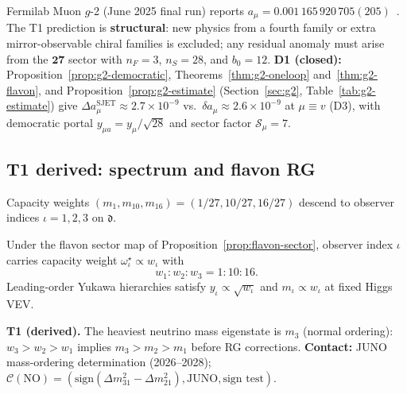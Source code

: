 \begin{remark}
Fermilab Muon $g$-2 (June 2025 final run) reports
$a_\mu=0.001\,165\,920\,705(205)$~\cite{MuonG2FNAL2025}.
The T1 prediction is \textbf{structural}: new physics from a fourth family or
extra mirror-observable chiral families is excluded; any residual anomaly must
arise from the $\mathbf{27}$ sector with $n_F=3$, $n_S=28$, and $b_0=12$.
\textbf{D1 (closed):} Proposition~\ref{prop:g2-democratic},
Theorems~\ref{thm:g2-oneloop} and~\ref{thm:g2-flavon}, and
Proposition~\ref{prop:g2-estimate} (Section~\ref{sec:g2},
Table~\ref{tab:g2-estimate}) give
$\Delta a_\mu^{\mathrm{SJET}}\approx2.7\times10^{-9}$ vs.\
$\delta a_\mu\approx2.6\times10^{-9}$ at $\mu\equiv v$ (D3), with democratic
portal $y_{\mu a}=y_\mu/\sqrt{28}$ and sector factor $\mathcal{S}_\mu=7$.
\end{remark}

\subsection{T1 derived: spectrum and flavon RG}
\label{sec:predictions:T1-derived-spectrum}

Capacity weights $(m_1,m_{10},m_{16})=(1/27,10/27,16/27)$ descend to observer
indices $\iota=1,2,3$ on $\mathfrak{d}$.

\begin{proposition}\label{prop:gen-ordering}
Under the flavon sector map of Proposition~\ref{prop:flavon-sector}, observer
index $\iota$ carries capacity weight $\omega^\star_\iota\propto w_\iota$ with
\begin{equation}\label{eq:capacity-weights}
  w_1:w_2:w_3 = 1:10:16.
\end{equation}
Leading-order Yukawa hierarchies satisfy $y_\iota\propto\sqrt{w_\iota}$ and
$m_\iota\propto w_\iota$ at fixed Higgs VEV.
\end{proposition}

\begin{prediction}\label{pred:nu-ordering}
\textbf{T1 (derived).} The heaviest neutrino mass eigenstate is $m_3$ (normal ordering):
$w_3>w_2>w_1$ implies $m_3>m_2>m_1$ before RG corrections.
\textbf{Contact:} JUNO mass-ordering determination (2026--2028);
$\mathcal{C}(\text{NO})=(\text{sign}(\Delta m^2_{31}-\Delta m^2_{21}),
\mathrm{JUNO},\text{sign test})$.
\end{prediction}

